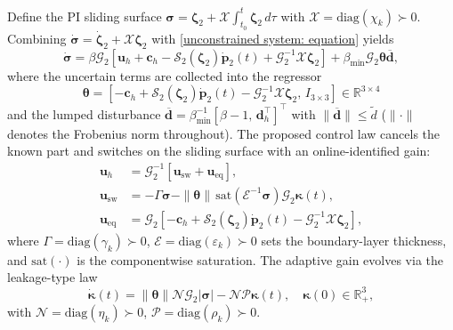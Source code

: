 Define the PI sliding surface $\boldsymbol{\sigma}=\boldsymbol{\zeta}_2+\mathcal{X}\!\int_{t_0}^{t}\boldsymbol{\zeta}_2\,d\tau$ with $\mathcal{X}=\text{diag}(\chi_k)\succ 0$. Combining $\dot{\boldsymbol{\sigma}}=\dot{\boldsymbol{\zeta}}_2+\mathcal{X}\boldsymbol{\zeta}_2$ with \eqref{unconstrained system: equation} yields
\begin{equation} \label{sigma derivative: equation 2}
    \dot{\boldsymbol{\sigma}} = \beta\mathcal{G}_2\!\left[\boldsymbol{u}_h+\boldsymbol{c}_h-\mathcal{S}_2(\boldsymbol{\zeta}_2)\dot{\boldsymbol{p}}_2(t)+\mathcal{G}_2^{-1}\mathcal{X}\boldsymbol{\zeta}_2\right] + \beta_{\min}\mathcal{G}_2\boldsymbol{\theta}\boldsymbol{\overline{d}},
\end{equation}
where the uncertain terms are collected into the regressor
\begin{equation} \label{regressor: equation}
    \boldsymbol{\theta} = [-\boldsymbol{c}_h+\mathcal{S}_2(\boldsymbol{\zeta}_2)\dot{\boldsymbol{p}}_2(t)-\mathcal{G}_2^{-1}\mathcal{X}\boldsymbol{\zeta}_2,\,I_{3\times 3}]\in\mathbb{R}^{3\times 4}
\end{equation}
and the lumped disturbance $\boldsymbol{\overline{d}}=\beta_{\min}^{-1}[\beta-1,\,\boldsymbol{d}_h^\top]^\top$ with $\|\boldsymbol{\overline{d}}\|\le\tilde{d}$ ($\|\cdot\|$ denotes the Frobenius norm throughout). The proposed control law cancels the known part and switches on the sliding surface with an online-identified gain:
\begin{align} \label{adaptive control law: equation}
    \boldsymbol{u}_h &= \mathcal{G}_2^{-1}[\boldsymbol{u}_\text{sw}+\boldsymbol{u}_\text{eq}],\nonumber\\
    \boldsymbol{u}_\text{sw} &= -\Gamma\boldsymbol{\sigma} - \|\boldsymbol{\theta}\|\,\text{sat}(\mathcal{E}^{-1}\boldsymbol{\sigma})\mathcal{G}_2\boldsymbol{\kappa}(t),\\
    \boldsymbol{u}_\text{eq} &= \mathcal{G}_2\!\left[-\boldsymbol{c}_h+\mathcal{S}_2(\boldsymbol{\zeta}_2)\dot{\boldsymbol{p}}_2(t)-\mathcal{G}_2^{-1}\mathcal{X}\boldsymbol{\zeta}_2\right],\nonumber
\end{align}
where $\Gamma=\text{diag}(\gamma_k)\succ 0$, $\mathcal{E}=\text{diag}(\varepsilon_k)\succ 0$ sets the boundary-layer thickness, and $\text{sat}(\cdot)$ is the componentwise saturation. The adaptive gain evolves via the leakage-type law
\begin{equation} \label{adaptive law: equation}
    \dot{\boldsymbol{\kappa}}(t) = \|\boldsymbol{\theta}\|\mathcal{N}\mathcal{G}_2|\boldsymbol{\sigma}| - \mathcal{N}\mathcal{P}\boldsymbol{\kappa}(t),\quad\boldsymbol{\kappa}(0)\in\mathbb{R}_+^3,
\end{equation}
with $\mathcal{N}=\text{diag}(\eta_k)\succ 0$, $\mathcal{P}=\text{diag}(\rho_k)\succ 0$.

